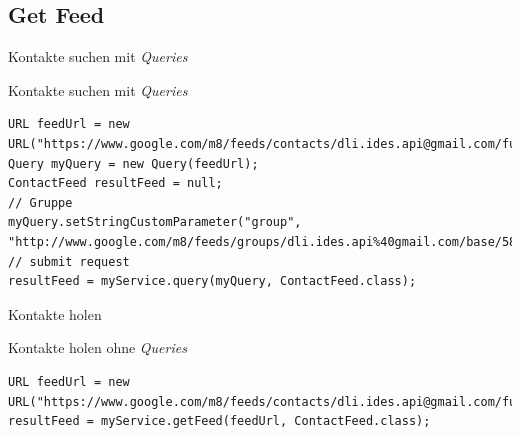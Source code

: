 \subsection{Get Feed}

\begin{frame}[fragile]{Kontakte suchen mit \emph{Queries}}
\begin{block}{Kontakte suchen mit \emph{Queries}}
\javalstset
\begin{lstlisting}
URL feedUrl = new URL("https://www.google.com/m8/feeds/contacts/dli.ides.api@gmail.com/full");
Query myQuery = new Query(feedUrl);
ContactFeed resultFeed = null;
// Gruppe
myQuery.setStringCustomParameter("group", "http://www.google.com/m8/feeds/groups/dli.ides.api%40gmail.com/base/587c880e884cdacb");
// submit request
resultFeed = myService.query(myQuery, ContactFeed.class);
\end{lstlisting}
\end{block}
\end{frame}

\begin{frame}[fragile]{Kontakte holen}
\begin{block}{Kontakte holen ohne \emph{Queries}}
\javalstset
\begin{lstlisting}
URL feedUrl = new URL("https://www.google.com/m8/feeds/contacts/dli.ides.api@gmail.com/full");
resultFeed = myService.getFeed(feedUrl, ContactFeed.class);
\end{lstlisting}
\end{block}
\end{frame}